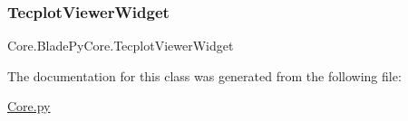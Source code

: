 \subsubsection{\texorpdfstring{Tecplot\+Viewer\+Widget}{TecplotViewerWidget}}
{\footnotesize\ttfamily Core.\+Blade\+Py\+Core.\+Tecplot\+Viewer\+Widget}



The documentation for this class was generated from the following file\+:\begin{DoxyCompactItemize}
\item 
\hyperlink{_core_8py}{Core.\+py}\end{DoxyCompactItemize}

